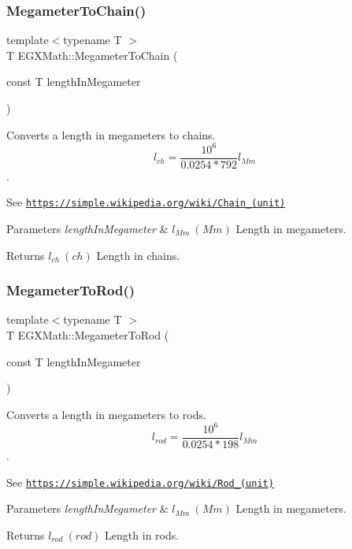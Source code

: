 \subsubsection{\texorpdfstring{Megameter\+To\+Chain()}{MegameterToChain()}}
{\footnotesize\ttfamily template$<$typename T $>$ \\
T E\+G\+X\+Math\+::\+Megameter\+To\+Chain (\begin{DoxyParamCaption}\item[{const T}]{length\+In\+Megameter }\end{DoxyParamCaption})}



Converts a length in megameters to chains. \[ l_{ch}= \frac{10^{6}}{0.0254 * 792} l_{Mm} \]. 

See \href{https://simple.wikipedia.org/wiki/Chain_(unit)}{\tt https\+://simple.\+wikipedia.\+org/wiki/\+Chain\+\_\+(unit)} 
\begin{DoxyParams}{Parameters}
{\em length\+In\+Megameter} & $ l_{Mm}\ (Mm)$ Length in megameters. \\
\hline
\end{DoxyParams}
\begin{DoxyReturn}{Returns}
$ l_{ch}\ (ch)$ Length in chains. 
\end{DoxyReturn}
\mbox{\label{group___e_g_x_math-_conversions-_length_conversions-_megameter-_surveyors_ga46cf50c3f1310663facf0befbf3d71fb}} 
\subsubsection{\texorpdfstring{Megameter\+To\+Rod()}{MegameterToRod()}}
{\footnotesize\ttfamily template$<$typename T $>$ \\
T E\+G\+X\+Math\+::\+Megameter\+To\+Rod (\begin{DoxyParamCaption}\item[{const T}]{length\+In\+Megameter }\end{DoxyParamCaption})}



Converts a length in megameters to rods. \[ l_{rod}= \frac{10^{6}}{0.0254 * 198} l_{Mm} \]. 

See \href{https://simple.wikipedia.org/wiki/Rod_(unit)}{\tt https\+://simple.\+wikipedia.\+org/wiki/\+Rod\+\_\+(unit)} 
\begin{DoxyParams}{Parameters}
{\em length\+In\+Megameter} & $ l_{Mm}\ (Mm)$ Length in megameters. \\
\hline
\end{DoxyParams}
\begin{DoxyReturn}{Returns}
$ l_{rod}\ (rod)$ Length in rods. 
\end{DoxyReturn}

